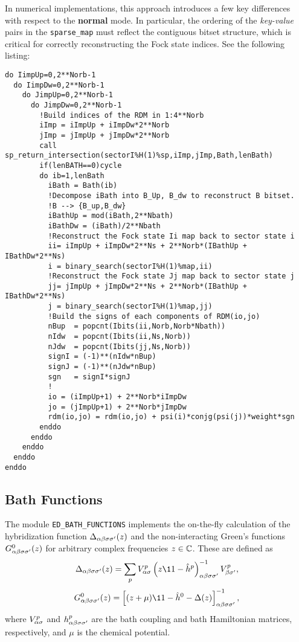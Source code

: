 \documentclass[edipack_sp.tex]{subfiles}
\begin{document}
  
In numerical implementations, this approach introduces a few 
key differences with respect to the {\bf normal} mode.
In particular, the 
ordering of the \emph{key-value} pairs in the {\tt sparse\_map} 
must reflect the contiguous bitset structure, which is critical 
for correctly reconstructing the Fock state indices.
See the following listing:
\begin{lstlisting}[style=fstyle,numbers=none,basicstyle={\scriptsize\ttfamily}]
do IimpUp=0,2**Norb-1
  do IimpDw=0,2**Norb-1
    do JimpUp=0,2**Norb-1
      do JimpDw=0,2**Norb-1
        !Build indices of the RDM in 1:4**Norb
        iImp = iImpUp + iImpDw*2**Norb
        jImp = jImpUp + jImpDw*2**Norb
        call sp_return_intersection(sectorI%H(1)%sp,iImp,jImp,Bath,lenBath)
        if(lenBATH==0)cycle
        do ib=1,lenBath
          iBath = Bath(ib)
          !Decompose iBath into B_Up, B_dw to reconstruct B bitset. 
          !B --> {B_up,B_dw}
          iBathUp = mod(iBath,2**Nbath)
          iBathDw = (iBath)/2**Nbath
          !Reconstruct the Fock state Ii map back to sector state i
          ii= iImpUp + iImpDw*2**Ns + 2**Norb*(IBathUp + IBathDw*2**Ns)
          i = binary_search(sectorI%H(1)%map,ii)
          !Reconstruct the Fock state Jj map back to sector state j
          jj= jImpUp + jImpDw*2**Ns + 2**Norb*(IBathUp + IBathDw*2**Ns)
          j = binary_search(sectorI%H(1)%map,jj)
          !Build the signs of each components of RDM(io,jo)
          nBup  = popcnt(Ibits(ii,Norb,Norb*Nbath))
          nIdw  = popcnt(Ibits(ii,Ns,Norb))
          nJdw  = popcnt(Ibits(jj,Ns,Norb))
          signI = (-1)**(nIdw*nBup)
          signJ = (-1)**(nJdw*nBup)
          sgn   = signI*signJ
          !  
          io = (iImpUp+1) + 2**Norb*iImpDw
          jo = (jImpUp+1) + 2**Norb*jImpDw
          rdm(io,jo) = rdm(io,jo) + psi(i)*conjg(psi(j))*weight*sgn
        enddo
      enddo
    enddo
  enddo
enddo
\end{lstlisting}


\subsection{Bath Functions}\label{sSecFunc}
The module {\tt ED\_BATH\_FUNCTIONS} implements the on-the-fly 
calculation of the hybridization function 
$\Delta_{\alpha\beta\sigma\sigma'}(z)$ and the non-interacting Green's functions 
$G^0_{\alpha\beta\sigma\sigma'}(z)$ for arbitrary complex frequencies $z \in \mathbb{C}$. 
These are defined as
\begin{equation}
\Delta_{\a\b\s\s'}(z) = \sum_p V^p_{\a\s} 
\left( z\11 - \hat{h}^p \right)_{\a\b\s\s'}^{-1} V^p_{\b\s'},
\end{equation}
\begin{equation}
G^0_{\a\b\s\s'}(z) = 
\left[ (z + \mu)\11 - \hat{h}^0 - 
\Delta(z) \right]_{\a\b\s\s'}^{-1},
\end{equation}
where $V^p_{\alpha\sigma}$ and $h^p_{\alpha\beta\sigma\sigma'}$ are the bath coupling 
and bath Hamiltonian matrices, respectively, and $\mu$ is the chemical 
potential.
\end{document}
